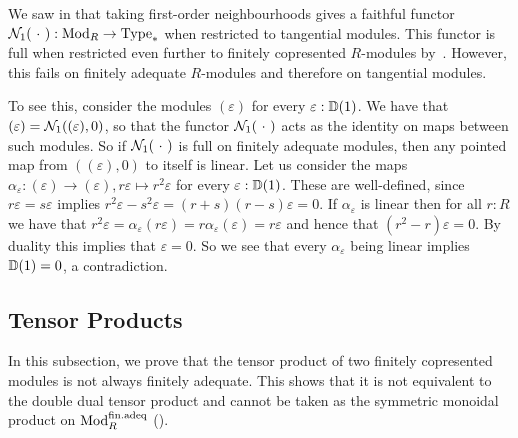 \begin{counterexample}
  We saw in  that taking first-order neighbourhoods
  gives a faithful functor $\hood{\argmhole}{1} : \modcat R \rightarrow \pType$
  when restricted to tangential modules.
  This functor is full when restricted even further to finitely copresented $R$-modules
  by~\cite[Lemma 2.3.8]{diffgeo-article}.
  However, this fails on finitely adequate $R$-modules and therefore on tangential modules.

  To see this, consider the modules $(\varepsilon)$ for every $\varepsilon:\D(1)$. We have that $(\varepsilon) = \hood{(\varepsilon),0}{1}$, so that the functor $\hood{\argmhole}{1}$ acts as the identity on maps between such modules. So if $\hood{\argmhole}{1}$ is full on finitely adequate modules, then any pointed map from $((\varepsilon),0)$ to itself is linear. Let us consider the maps $\alpha_\varepsilon : (\varepsilon) \to (\varepsilon), r\varepsilon \mapsto r^2\varepsilon$ for every $\varepsilon:\D(1)$. These are well-defined, since $r\varepsilon = s\varepsilon$ implies $r^2\varepsilon-s^2\varepsilon = (r+s)(r-s)\varepsilon = 0$. If $\alpha_\varepsilon$ is linear then for all $r:R$ we have that $r^2\varepsilon = \alpha_\varepsilon(r\varepsilon) = r\alpha_\varepsilon(\varepsilon) = r\varepsilon$ and hence that $(r^2-r)\varepsilon=0$. By duality this implies that $\varepsilon=0$. So we see that every $\alpha_\varepsilon$ being linear implies $\D(1)=0$, a contradiction.
\end{counterexample}


\subsection{Tensor Products}\label{ss:ex-tensor-products}

In this subsection, we prove that the tensor product of two finitely copresented modules is not always finitely adequate.
This shows that it is not equivalent to the double dual tensor product and cannot be taken as the symmetric monoidal product on $\finadeq$ ().

